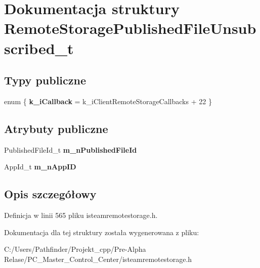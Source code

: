 \hypertarget{struct_remote_storage_published_file_unsubscribed__t}{}\section{Dokumentacja struktury Remote\+Storage\+Published\+File\+Unsubscribed\+\_\+t}
\label{struct_remote_storage_published_file_unsubscribed__t}
\subsection*{Typy publiczne}
\begin{DoxyCompactItemize}
\item 
\mbox{\label{struct_remote_storage_published_file_unsubscribed__t_aa83dd30c97c2dd2f8edc40925e7d9ba1}} 
enum \{ {\bfseries k\+\_\+i\+Callback} = k\+\_\+i\+Client\+Remote\+Storage\+Callbacks + 22
 \}
\end{DoxyCompactItemize}
\subsection*{Atrybuty publiczne}
\begin{DoxyCompactItemize}
\item 
\mbox{\label{struct_remote_storage_published_file_unsubscribed__t_ab55a8bf637e3fc784f642679766067f5}} 
Published\+File\+Id\+\_\+t {\bfseries m\+\_\+n\+Published\+File\+Id}
\item 
\mbox{\label{struct_remote_storage_published_file_unsubscribed__t_afb81b9afccdac8f83236554bd8d6c277}} 
App\+Id\+\_\+t {\bfseries m\+\_\+n\+App\+ID}
\end{DoxyCompactItemize}


\subsection{Opis szczegółowy}


Definicja w linii 565 pliku isteamremotestorage.\+h.



Dokumentacja dla tej struktury została wygenerowana z pliku\+:\begin{DoxyCompactItemize}
\item 
C\+:/\+Users/\+Pathfinder/\+Projekt\+\_\+cpp/\+Pre-\/\+Alpha Relase/\+P\+C\+\_\+\+Master\+\_\+\+Control\+\_\+\+Center/isteamremotestorage.\+h\end{DoxyCompactItemize}
